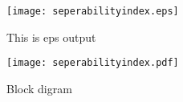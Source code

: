 \documentclass[12pt,a4paper,final,oneside]{report}
\begin{document}
\begin{figure}
	\centering
\texttt{[image: seperabilityindex.eps]}
\caption{This is eps output}
	\label{a}
\end{figure}


\begin{figure}
	\centering
\texttt{[image: seperabilityindex.pdf]}
\caption{Block digram}
	\label{This is pdf output}
\end{figure}
\end{document}
